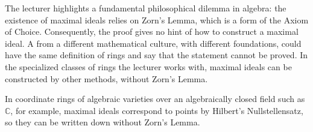 \begin{content}
\begin{center}
\end{center}
\end{content}

\begin{insight}
The lecturer highlights a fundamental philosophical dilemma in algebra: the existence of maximal ideals relies on Zorn's Lemma, which is a form of the Axiom of Choice. Consequently, the proof gives no hint of how to construct a maximal ideal. A  from a different mathematical culture, with different foundations, could have the same definition of rings and say that the statement cannot be proved. In the specialized classes of rings the lecturer works with, maximal ideals can be constructed by other methods, without Zorn's Lemma.
\end{insight}

\begin{aiNote}
In coordinate rings of algebraic varieties over an algebraically closed field such as $\mathbb{C}$, for example, maximal ideals correspond to points by Hilbert's Nullstellensatz, so they can be written down without Zorn's Lemma.
\end{aiNote}

